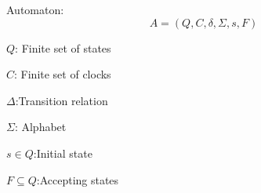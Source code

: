 \begin{definition}
    Automaton:
    $$A=(Q,C,\delta,\Sigma,s,F)$$

    $Q$: Finite set of states

    $C$: Finite set of clocks
    
    $\Delta$:Transition relation
    
    $\Sigma$: Alphabet
    
    $s\in Q$:Initial state
    
    $F\subseteq Q$:Accepting states
\end{definition}